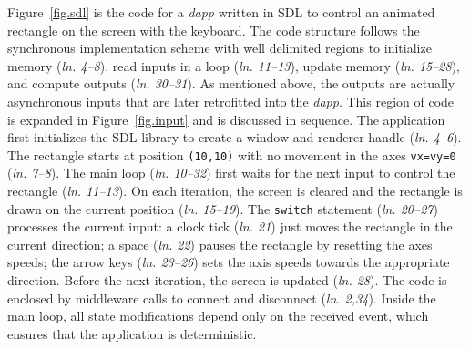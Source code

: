 \documentclass[sigplan,screen]{acmart}
\newcommand{\lin}[1]{(\emph{ln. #1}\xspace)}
\newcommand{\dapp}{\emph{dapp}\xspace}
\begin{document}
Figure~\ref{fig.sdl} is the code for a \dapp written in SDL to control an
animated rectangle on the screen with the keyboard.
The code structure follows the synchronous implementation scheme with well
delimited regions to initialize memory \lin{4--8}, read inputs in a loop
\lin{11--13}, update memory \lin{15--28}, and compute outputs \lin{30--31}.
As mentioned above, the outputs are actually asynchronous inputs that are later
retrofitted into the \dapp.
This region of code is expanded in Figure~\ref{fig.input} and is discussed in
sequence.
The application first initializes the SDL library to create a window and
renderer handle \lin{4--6}.
The rectangle starts at position \texttt{(10,10)} with no movement in the axes
\texttt{vx=vy=0} \lin{7--8}.
The main loop \lin{10--32} first waits for the next input to control the
rectangle \lin{11--13}.
On each iteration, the screen is cleared and the rectangle is drawn on the
current position \lin{15--19}.
The \texttt{switch} statement \lin{20--27} processes the current input:
    a clock tick \lin{21} just moves the rectangle in the current direction;
    a space \lin{22} pauses the rectangle by resetting the axes speeds;
    the arrow keys \lin{23--26} sets the axis speeds towards the appropriate direction.
Before the next iteration, the screen is updated \lin{28}.
The code is enclosed by middleware calls to connect and disconnect \lin{2,34}.
Inside the main loop, all state modifications depend only on the received
event, which ensures that the application is deterministic.
\end{document}
